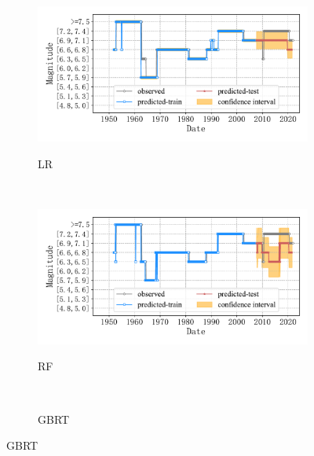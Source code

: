 \begin{figure}[!htbp]
\begin{subfigure}[b]{0.45\textwidth}
      \caption{LR}
      \vspace{-0.2cm}
      \includegraphics[width=\textwidth]{Img/chap5_seism/future10_class/seism_lr_minyear_1932_maxyear_2021_spanlat_2_spanlon_4_timewindow_120_nextmonth_120_minmag_3.0_split_ratio_0.8_blocks1_class.pdf}
      \vspace{-1cm}
      \label{fig:seism_lr_minyear_1932_maxyear_2021_spanlat_2_spanlon_4_timewindow_120_nextmonth_120_minmag_3.0_split_ratio_0.8_blocks1_class}
  \end{subfigure}
  ~
  \begin{subfigure}[b]{0.45\textwidth}
    \caption{RF}
    \vspace{-0.2cm}
    \includegraphics[width=\textwidth]{Img/chap5_seism/future10_class/seism_rf_minyear_1932_maxyear_2021_spanlat_2_spanlon_4_timewindow_120_nextmonth_120_minmag_3.0_split_ratio_0.8_blocks1_class.pdf}
    \vspace{-1cm}
    \label{fig:seism_rf_minyear_1932_maxyear_2021_spanlat_2_spanlon_4_timewindow_120_nextmonth_120_minmag_3.0_split_ratio_0.8_blocks1_class}
  \end{subfigure}
  \\
  \begin{subfigure}[b]{0.45\textwidth}
    \caption{GBRT}

\end{subfigure}
\end{figure}
